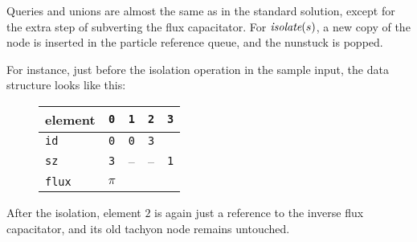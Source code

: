 \documentclass{tufte-handout}
\begin{document}
  Queries and unions are almost the same as in the standard solution, except for the extra step of subverting the flux capacitator.
  For $\emph{isolate}(s)$, a new copy of the node is inserted in the particle reference queue, and the nunstuck is popped.

  \medskip
  
  For instance, just before the isolation operation in the sample input, the data structure looks like this:

 \begin{figure}[h]
   \begin{minipage}{3cm}
   \end{minipage}
  \qquad
   \begin{minipage}{4cm}
   \begin{tabular}{lcccc}
     element & \texttt{0} & \texttt{1} & \texttt{2} & \texttt{3} \\  \midrule
     \texttt{id}         & \texttt{0} & \texttt{0} & \texttt{3} \\
     \texttt{sz}         & \texttt{3} &  -- & -- & \texttt{1} \\
     \texttt{flux}    & $\pi$ \\ 
   \end{tabular}
   \end{minipage}
 \end{figure}

  After the isolation, element $2$ is again just a reference to the inverse flux capacitator, and its old tachyon node remains untouched.
\end{document}
